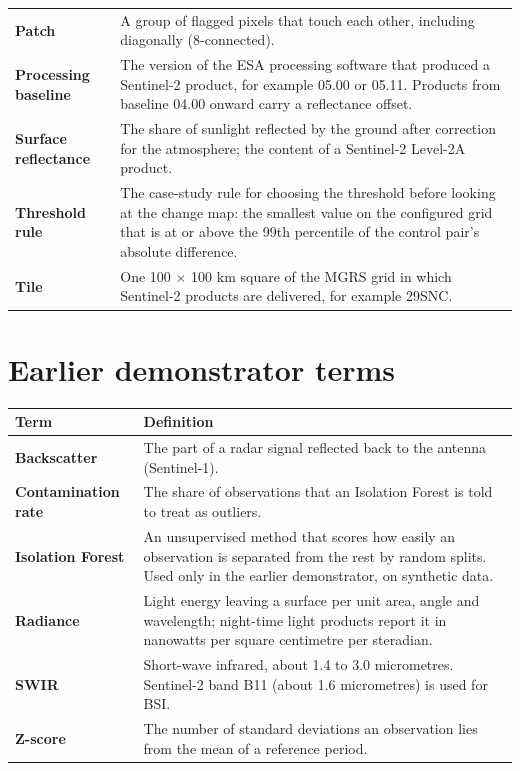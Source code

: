 {\begin{longtable}{>{\raggedright\arraybackslash}p{4.63cm}>{\raggedright\arraybackslash}p{9.57cm}}
\textbf{Patch} & A group of flagged pixels that touch each other, including diagonally (8-connected). \\
\textbf{Processing baseline} & The version of the ESA processing software that produced a Sentinel-2 product, for example 05.00 or 05.11. Products from baseline 04.00 onward carry a reflectance offset. \\
\textbf{Surface reflectance} & The share of sunlight reflected by the ground after correction for the atmosphere; the content of a Sentinel-2 Level-2A product. \\
\textbf{Threshold rule} & The case-study rule for choosing the threshold before looking at the change map: the smallest value on the configured grid that is at or above the 99th percentile of the control pair's absolute difference. \\
\textbf{Tile} & One 100 $\times$ 100 km square of the MGRS grid in which Sentinel-2 products are delivered, for example 29SNC. \\
\bottomrule
\end{longtable}
}

\section{Earlier demonstrator terms}

{\small
\begin{longtable}{>{\raggedright\arraybackslash}p{3.81cm}>{\raggedright\arraybackslash}p{10.39cm}}
\toprule
Term & Definition \\
\midrule
\endhead
\textbf{Backscatter} & The part of a radar signal reflected back to the antenna (Sentinel-1). \\
\textbf{Contamination rate} & The share of observations that an Isolation Forest is told to treat as outliers. \\
\textbf{Isolation Forest} & An unsupervised method that scores how easily an observation is separated from the rest by random splits. Used only in the earlier demonstrator, on synthetic data. \\
\textbf{Radiance} & Light energy leaving a surface per unit area, angle and wavelength; night-time light products report it in nanowatts per square centimetre per steradian. \\
\textbf{SWIR} & Short-wave infrared, about 1.4 to 3.0 micrometres. Sentinel-2 band B11 (about 1.6 micrometres) is used for BSI. \\
\textbf{Z-score} & The number of standard deviations an observation lies from the mean of a reference period. \\
\bottomrule
\end{longtable}
}

